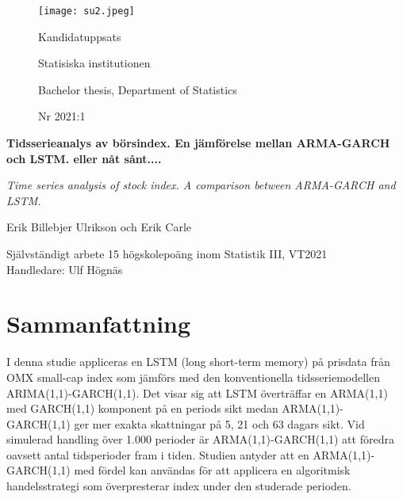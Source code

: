\documentclass[11pt]{article}
\numberwithin{equation}{section}
\numberwithin{table}{section}
\numberwithin{figure}{section}
\begin{document}
\begin{titlepage}
\thispagestyle{empty}
	\begin{figure}[ht]
			\texttt{[image: su2.jpeg]}
			
	   \endminipage
		 \Large Kandidatuppsats \par
		 \large Statisiska institutionen \par
		  \small Bachelor thesis, Department of   Statistics \par
		   \large Nr 2021:1 \par
			
\endminipage
\end{figure}
	
	
\centering
\vspace{5cm}

{\large\bfseries Tidsserieanalys av börsindex. En jämförelse mellan ARMA-GARCH och LSTM. eller nåt sånt....\par}
	\vspace{0.5cm}
	
{\large\itshape Time series analysis of stock index. A comparison between ARMA-GARCH and LSTM. \par}
	\vfill
	
	

{\Large Erik Billebjer Ulrikson och Erik Carle\par}
	\vspace{0.5cm}
	
\begin{flushleft}
Självständigt arbete 15 högskolepoäng inom Statistik III, VT2021 \\
Handledare: Ulf Högnäs\\

\end{flushleft}
\end{titlepage}


\newpage
\thispagestyle{empty}
\section*{Sammanfattning}

I denna studie appliceras en LSTM (long short-term memory) på prisdata från OMX small-cap index som jämförs med den konventionella tidsseriemodellen ARIMA(1,1)-GARCH(1,1). Det visar sig att LSTM överträffar en ARMA(1,1) med GARCH(1,1) komponent på en periods sikt medan ARMA(1,1)-GARCH(1,1) ger mer exakta skattningar på 5, 21 och 63 dagars sikt. Vid simulerad handling över 1.000 perioder är ARMA(1,1)-GARCH(1,1) att föredra oavsett antal tidsperioder fram i tiden. Studien antyder att en ARMA(1,1)-GARCH(1,1) med fördel kan användas för att applicera en algoritmisk handelsstrategi som överpresterar index under den studerade perioden. 
\end{document}
